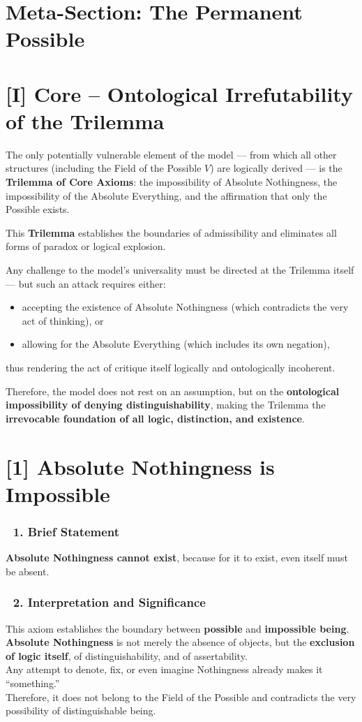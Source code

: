 \documentclass[12pt]{article}
\begin{document}
\section*{Meta-Section: The Permanent Possible}

\section*{[I] Core – Ontological Irrefutability of the Trilemma}

The only potentially vulnerable element of the model — from which all other structures (including the Field of the Possible $V$) are logically derived — is the \textbf{Trilemma of Core Axioms}:
the impossibility of Absolute Nothingness, the impossibility of the Absolute Everything, and the affirmation that only the Possible exists.

This \textbf{Trilemma} establishes the boundaries of admissibility and eliminates all forms of paradox or logical explosion.

Any challenge to the model’s universality must be directed at the Trilemma itself — but such an attack requires either:
\begin{itemize}
\item accepting the existence of Absolute Nothingness (which contradicts the very act of thinking), or
\item allowing for the Absolute Everything (which includes its own negation),
\end{itemize}
thus rendering the act of critique itself logically and ontologically incoherent.

Therefore, the model does not rest on an assumption, but on the \textbf{ontological impossibility of denying distinguishability}, making the Trilemma the \textbf{irrevocable foundation of all logic, distinction, and existence}.

\section*{[1] Absolute Nothingness is Impossible}

\subsubsection*{🔹 1. Brief Statement}
\textbf{Absolute Nothingness cannot exist}, because for it to exist, even itself must be absent.

\subsubsection*{🔹 2. Interpretation and Significance}
This axiom establishes the boundary between \textbf{possible} and \textbf{impossible being}.\\
\textbf{Absolute Nothingness} is not merely the absence of objects, but the \textbf{exclusion of logic itself}, of distinguishability, and of assertability.\\
Any attempt to denote, fix, or even imagine Nothingness already makes it ``something.''\\
Therefore, it does not belong to the Field of the Possible and contradicts the very possibility of distinguishable being.
\end{document}
